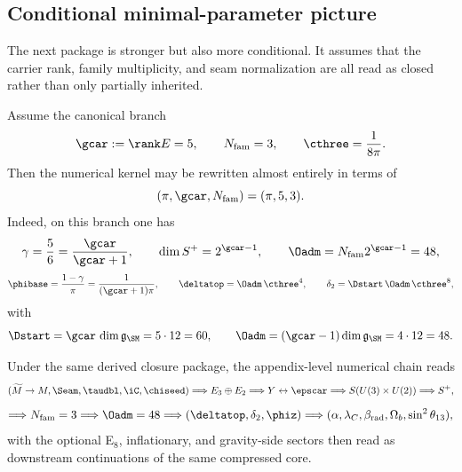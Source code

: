 \subsection{Conditional minimal-parameter picture}

The next package is stronger but also more conditional. It assumes that the carrier rank, family multiplicity, and seam normalization are all read as closed rather than only partially inherited.

\begin{principle}
Assume the canonical branch
\[
\gcar:=\rank E=5,
\qquad
N_{\mathrm{fam}}=3,
\qquad
\cthree=\frac{1}{8\pi}.
\]
Then the numerical kernel may be rewritten almost entirely in terms of
\[
(\pi,\gcar,N_{\mathrm{fam}})=(\pi,5,3).
\]
Indeed, on this branch one has
\[
\gamma=\frac56=\frac{\gcar}{\gcar+1},
\qquad
\dim S^+=2^{\gcar-1},
\qquad
\Oadm=N_{\mathrm{fam}}2^{\gcar-1}=48,
\]
\[
\phibase=\frac{1-\gamma}{\pi}=\frac{1}{(\gcar+1)\pi},
\qquad
\deltatop=\Oadm\,\cthree^4,
\qquad
\delta_2=\Dstart\,\Oadm\,\cthree^8,
\]
with
\[
\Dstart=\gcar\,\dim\mathfrak g_{\SM}=5\cdot 12=60,
\qquad
\Oadm=(\gcar-1)\dim\mathfrak g_{\SM}=4\cdot 12=48.
\]
\end{principle}

\begin{remark}
Under the same derived closure package, the appendix-level numerical chain reads
\[
(\widetilde M\to M,\Seam,\taudbl,\iC,\chiseed)
\Longrightarrow
E_3\oplus E_2
\Longrightarrow
Y \leftrightarrow \epscar
\Longrightarrow
S(U(3)\times U(2))
\Longrightarrow
S^+,
\]
\[
\Longrightarrow
N_{\mathrm{fam}}=3
\Longrightarrow
\Oadm=48
\Longrightarrow
(\deltatop,\delta_2,\phiz)
\Longrightarrow
(\alpha,\lambda_C,\beta_{\mathrm{rad}},\Omega_b,\sin^2\theta_{13}),
\]
with the optional E$_8$, inflationary, and gravity-side sectors then read as downstream continuations of the same compressed core.
\end{remark}

